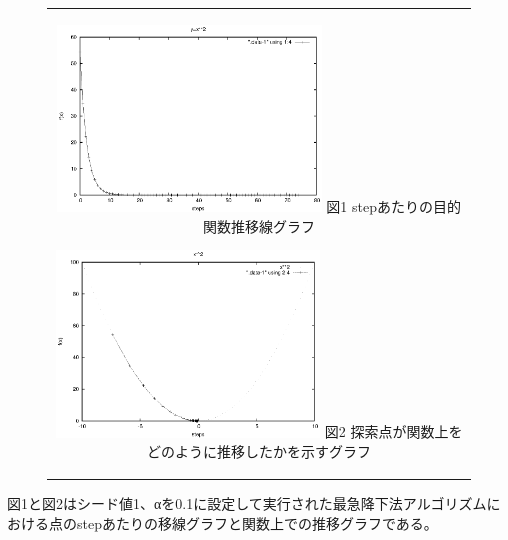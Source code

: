 \begin{figure}[htbp]
  \begin{center}
    \begin{tabular}{c}

      \begin{minipage}{0.5\hsize}
        \begin{center}
          \includegraphics[clip, width=7cm]{./figs/sim2-1_step-1.eps}
          \hspace{1.6cm} 図1 stepあたりの目的関数推移線グラフ
        \end{center}
      \end{minipage}

      \begin{minipage}{0.5\hsize}
        \begin{center}
          \includegraphics[clip, width=7cm]{./figs/sim2-1-1.eps}
          \hspace{1.6cm} 図2 探索点が関数上をどのように推移したかを示すグラフ
        \end{center}
      \end{minipage}

    \end{tabular}
  \end{center}
\end{figure}
\newline
図1と図2はシード値1、αを0.1に設定して実行された最急降下法アルゴリズムにおける点のstepあたりの移線グラフと関数上での推移グラフである。
